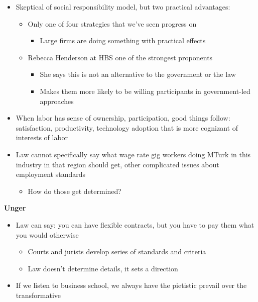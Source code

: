 \begin{itemize}
\tightlist
\item
  Skeptical of social responsibility model, but two practical
  advantages:

  \begin{itemize}
  \tightlist
  \item
    Only one of four strategies that we've seen progress on

    \begin{itemize}
    \tightlist
    \item
      Large firms are doing something with practical effects
    \end{itemize}
  \item
    Rebecca Henderson at HBS one of the strongest proponents

    \begin{itemize}
    \tightlist
    \item
      She says this is not an alternative to the government or the law
    \item
      Makes them more likely to be willing participants in
      government-led approaches
    \end{itemize}
  \end{itemize}
\item
  When labor has sense of ownership, participation, good things follow:
  satisfaction, productivity, technology adoption that is more cognizant
  of interests of labor
\item
  Law cannot specifically say what wage rate gig workers doing MTurk in
  this industry in that region should get, other complicated issues
  about employment standards

  \begin{itemize}
  \tightlist
  \item
    How do those get determined?
  \end{itemize}
\end{itemize}

\textbf{Unger}

\begin{itemize}
\tightlist
\item
  Law can say: you can have flexible contracts, but you have to pay them
  what you would otherwise

  \begin{itemize}
  \tightlist
  \item
    Courts and jurists develop series of standards and criteria
  \item
    Law doesn't determine details, it sets a direction
  \end{itemize}
\item
  If we listen to business school, we always have the pietistic prevail
  over the transformative
\end{itemize}

